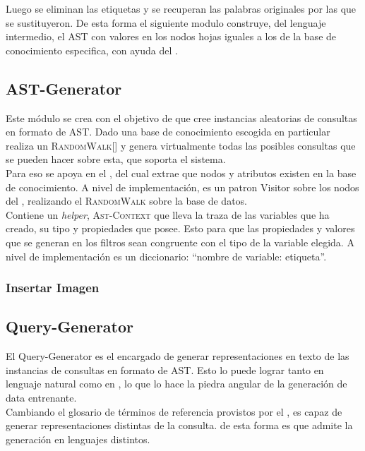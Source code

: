 Luego se eliminan las etiquetas y se recuperan las palabras originales por las que se sustituyeron. De esta forma el siguiente modulo construye, del lenguaje intermedio, el AST con valores en los nodos hojas iguales a los de la base de conocimiento especifica, con ayuda del .

\subsection{AST-Generator}
\label{ast-g}
Este m\'odulo se crea con el objetivo de que cree instancias aleatorias de consultas en formato de AST. Dado una base de conocimiento escogida en particular realiza un \textsc{RandomWalk}[] y genera virtualmente todas las posibles consultas que se pueden hacer sobre esta, que soporta el sistema.\\

Para eso se apoya en el , del cual extrae que nodos y atributos existen en la base de conocimiento. A nivel de implementaci\'on, es un patron Visitor sobre los nodos del , realizando el \textsc{RandomWalk} sobre la base de datos.\\

Contiene un \textit{helper}, \textsc{Ast-Context} que lleva la traza de las variables que ha creado, su tipo y propiedades que posee. Esto para que las propiedades y valores que se generan en los filtros sean congruente con el tipo de la variable elegida. A nivel de implementación es un diccionario: ``nombre de variable: etiqueta''.

\subsubsection{Insertar Imagen}
        
\subsection{Query-Generator}
\label{query-g}
El Query-Generator es el encargado de generar representaciones en texto de las instancias de consultas en formato de AST. Esto lo puede lograr tanto en lenguaje natural como en , lo que lo hace la piedra angular de la generaci\'on de data entrenante.\\

Cambiando el glosario de términos de referencia provistos por el , es capaz de generar representaciones distintas de la consulta. de esta forma es que admite la generaci\'on en lenguajes distintos.\\

